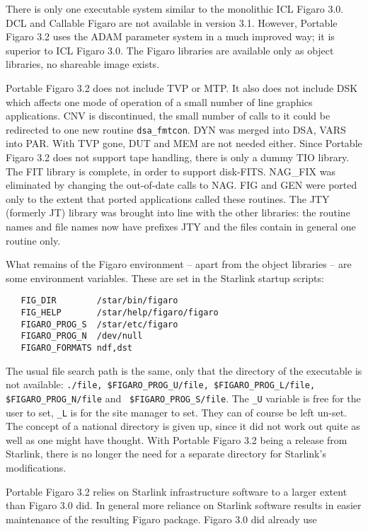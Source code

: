 There is only one executable system similar to the monolithic ICL Figaro
3.0. DCL and Callable Figaro are not available in version 3.1.  However,
Portable Figaro 3.2 uses the ADAM parameter system in a much improved
way; it is superior to ICL Figaro 3.0. The Figaro libraries are
available only as object libraries, no shareable image exists.

Portable Figaro 3.2 does not include TVP or MTP.  It also does not
include DSK which affects one mode of operation of a small number of
line graphics applications. CNV is discontinued, the small number of
calls to it could be redirected to one new routine {\tt dsa\_fmtcon}.
DYN was merged into DSA, VARS into PAR. With TVP gone, DUT and MEM are
not needed either.  Since Portable Figaro 3.2 does not support tape
handling, there is only a dummy TIO library. The FIT library is
complete, in order to support disk-FITS.  NAG\_FIX was eliminated by
changing the out-of-date calls to NAG. FIG and GEN were ported only to
the extent that ported applications called these routines. The JTY
(formerly JT) library was brought into line with the other libraries:
the routine names and file names now have prefixes JTY and the files
contain in general one routine only.

What remains of the Figaro environment -- apart from the object
libraries -- are some environment variables. These are set in the
Starlink startup scripts:

\begin{verbatim}
   FIG_DIR        /star/bin/figaro
   FIG_HELP       /star/help/figaro/figaro
   FIGARO_PROG_S  /star/etc/figaro
   FIGARO_PROG_N  /dev/null
   FIGARO_FORMATS ndf,dst
\end{verbatim}

The usual file search path is the same, only that the directory of the
executable is not available: {\tt ./file, \$FIG\-ARO\-\_PROG\-\_U/\-file,
\$FIG\-ARO\-\_PROG\-\_L/\-file, \$FIG\-ARO\-\_PROG\-\_N/\-file} and {\tt
\$FIG\-ARO\-\_\-PROG\-\_S/\-file}.  The {\tt \_U} variable is free for the user
to set, {\tt \_L} is for the site manager to set. They can of course be
left un-set.  The concept of a national directory is given up, since it
did not work out quite as well as one might have thought. With Portable
Figaro 3.2 being a release from Starlink, there is no longer the need
for a separate directory for Starlink's modifications.

Portable Figaro 3.2 relies on Starlink infrastructure software to a
larger extent than Figaro 3.0 did.  In general more reliance on Starlink
software results in easier maintenance of the resulting Figaro package.
Figaro 3.0 did already use

